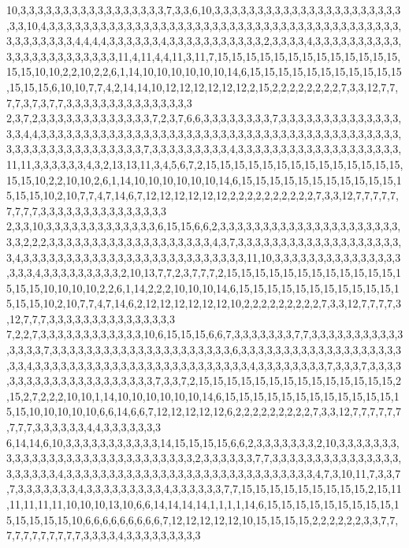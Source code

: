 10,3,3,3,3,3,3,3,3,3,3,3,3,3,3,3,3,3,7,3,3,6,10,3,3,3,3,3,3,3,3,3,3,3,3,3,3,3,3,3,3,3,3,3,3,3,3,10,4,3,3,3,3,3,3,3,3,3,3,3,3,3,3,3,3,3,3,3,3,3,3,3,3,3,3,3,3,3,3,3,3,3,3,3,3,3,3,3,3,3,3,3,3,3,3,3,3,3,4,4,4,4,3,3,3,3,3,3,4,3,3,3,3,3,3,3,3,3,3,3,2,3,3,3,3,4,3,3,3,3,3,3,3,3,3,3,3,3,3,3,3,3,3,3,3,3,3,3,3,11,4,11,4,4,11,3,11,7,15,15,15,15,15,15,15,15,15,15,15,15,15,15,15,10,10,2,2,10,2,2,6,1,14,10,10,10,10,10,10,14,6,15,15,15,15,15,15,15,15,15,15,15,15,15,15,6,10,10,7,7,4,2,14,14,10,12,12,12,12,12,12,2,15,2,2,2,2,2,2,2,2,7,3,3,12,7,7,7,7,3,7,3,7,7,3,3,3,3,3,3,3,3,3,3,3,3,3,3,3
2,3,7,2,3,3,3,3,3,3,3,3,3,3,3,3,3,7,2,3,7,6,6,3,3,3,3,3,3,3,3,7,3,3,3,3,3,3,3,3,3,3,3,3,3,3,3,3,4,4,3,3,3,3,3,3,3,3,3,3,3,3,3,3,3,3,3,3,3,3,3,3,3,3,3,3,3,3,3,3,3,3,3,3,3,3,3,3,3,3,3,3,3,3,3,3,3,3,3,3,3,3,3,3,3,3,3,3,7,3,3,3,3,3,3,3,3,3,4,3,3,3,3,3,3,3,3,3,3,3,3,3,3,3,3,3,3,3,11,11,3,3,3,3,3,3,4,3,2,13,13,11,3,4,5,6,7,2,15,15,15,15,15,15,15,15,15,15,15,15,15,15,15,15,10,2,2,10,10,2,6,1,14,10,10,10,10,10,10,14,6,15,15,15,15,15,15,15,15,15,15,15,15,15,15,10,2,10,7,7,4,7,14,6,7,12,12,12,12,12,12,2,2,2,2,2,2,2,2,2,2,7,3,3,12,7,7,7,7,7,7,7,7,7,3,3,3,3,3,3,3,3,3,3,3,3,3,3,3
2,3,3,10,3,3,3,3,3,3,3,3,3,3,3,3,3,6,15,15,6,6,2,3,3,3,3,3,3,3,3,3,3,3,3,3,3,3,3,3,3,3,3,3,3,3,2,2,2,3,3,3,3,3,3,3,3,3,3,3,3,3,3,3,3,3,3,3,4,3,7,3,3,3,3,3,3,3,3,3,3,3,3,3,3,3,3,3,3,3,3,4,3,3,3,3,3,3,3,3,3,3,3,3,3,3,3,3,3,3,3,3,3,3,3,3,3,3,11,10,3,3,3,3,3,3,3,3,3,3,3,3,3,3,3,3,3,3,4,3,3,3,3,3,3,3,3,3,2,10,13,7,7,2,3,7,7,7,2,15,15,15,15,15,15,15,15,15,15,15,15,15,15,15,10,10,10,10,2,2,6,1,14,2,2,2,10,10,10,14,6,15,15,15,15,15,15,15,15,15,15,15,15,15,15,10,2,10,7,7,4,7,14,6,2,12,12,12,12,12,12,10,2,2,2,2,2,2,2,2,2,7,3,3,12,7,7,7,7,3,12,7,7,7,3,3,3,3,3,3,3,3,3,3,3,3,3,3,3
7,2,2,7,3,3,3,3,3,3,3,3,3,3,3,3,10,6,15,15,15,6,6,7,3,3,3,3,3,3,3,7,7,3,3,3,3,3,3,3,3,3,3,3,3,3,3,3,7,3,3,3,3,3,3,3,3,3,3,3,3,3,3,3,3,3,3,3,3,3,6,3,3,3,3,3,3,3,3,3,3,3,3,3,3,3,3,3,3,3,3,3,4,3,3,3,3,3,3,3,3,3,3,3,3,3,3,3,3,3,3,3,3,3,3,3,3,3,4,3,3,3,3,3,3,3,3,7,3,3,3,7,3,3,3,3,3,3,3,3,3,3,3,3,3,3,3,3,3,3,3,3,3,7,3,3,7,2,15,15,15,15,15,15,15,15,15,15,15,15,15,15,2,15,2,7,2,2,2,10,10,1,14,10,10,10,10,10,10,14,6,15,15,15,15,15,15,15,15,15,15,15,15,15,15,10,10,10,10,10,6,6,14,6,6,7,12,12,12,12,12,6,2,2,2,2,2,2,2,2,2,7,3,3,12,7,7,7,7,7,7,7,7,7,3,3,3,3,3,3,4,4,3,3,3,3,3,3,3
6,14,14,6,10,3,3,3,3,3,3,3,3,3,3,3,14,15,15,15,15,6,6,2,3,3,3,3,3,3,3,2,10,3,3,3,3,3,3,3,3,3,3,3,3,3,3,3,3,3,3,3,3,3,3,3,3,3,3,3,3,3,2,3,3,3,3,3,3,7,7,3,3,3,3,3,3,3,3,3,3,3,3,3,3,3,3,3,3,3,3,3,4,3,3,3,3,3,3,3,3,3,3,3,3,3,3,3,3,3,3,3,3,3,3,3,3,3,3,3,3,3,4,7,3,10,11,7,3,3,7,7,3,3,3,3,3,3,3,4,3,3,3,3,3,3,3,3,3,4,3,3,3,3,3,3,7,7,15,15,15,15,15,15,15,15,15,2,15,11,11,11,11,11,10,10,10,13,10,6,6,14,14,14,14,1,1,1,1,14,6,15,15,15,15,15,15,15,15,15,15,15,15,15,15,10,6,6,6,6,6,6,6,6,6,7,12,12,12,12,12,10,15,15,15,15,2,2,2,2,2,2,3,3,7,7,7,7,7,7,7,7,7,7,7,3,3,3,3,4,3,3,3,3,3,3,3,3,3
